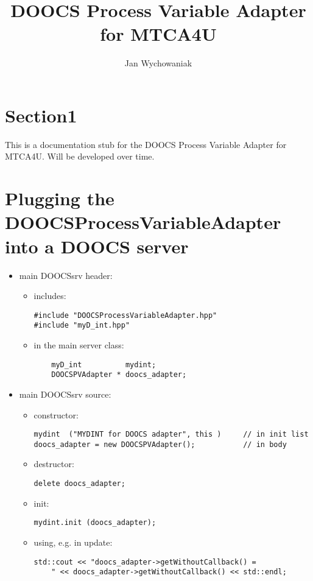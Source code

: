 \documentclass[11pt,a4paper]{scrartcl}
\title{DOOCS Process Variable Adapter for MTCA4U}
\author[1]{Jan Wychowaniak}
\affil[1]{TUL-DMCS, Lodz, Poland}
\begin{document}

\maketitle

\section{Section1}

This is a documentation stub for the DOOCS Process Variable Adapter for MTCA4U. Will be developed over time.

\newpage
\section{Plugging the DOOCSProcessVariableAdapter into a DOOCS server}

\begin{itemize}
  \item
    main DOOCSsrv header:
    \begin{itemize}
      \item
        includes:
\begin{verbatim}
#include "DOOCSProcessVariableAdapter.hpp"
#include "myD_int.hpp"
\end{verbatim}
      \item
        in the main server class:
\begin{verbatim}
	myD_int          mydint; 
	DOOCSPVAdapter * doocs_adapter;
\end{verbatim}
    \end{itemize}
 
  \item
    main DOOCSsrv source: \par
    \begin{itemize}
      \item
        constructor:
\begin{verbatim}
mydint  ("MYDINT for DOOCS adapter", this )     // in init list
doocs_adapter = new DOOCSPVAdapter();           // in body
\end{verbatim}
      \item
        destructor:
\begin{verbatim}
delete doocs_adapter;
\end{verbatim}
      \item
        init:
\begin{verbatim}
mydint.init (doocs_adapter);
\end{verbatim}
      \item
        using, e.g. in update:
\begin{verbatim}
std::cout << "doocs_adapter->getWithoutCallback() =
    " << doocs_adapter->getWithoutCallback() << std::endl;
\end{verbatim}
    \end{itemize}
\end{itemize}
\end{document}
